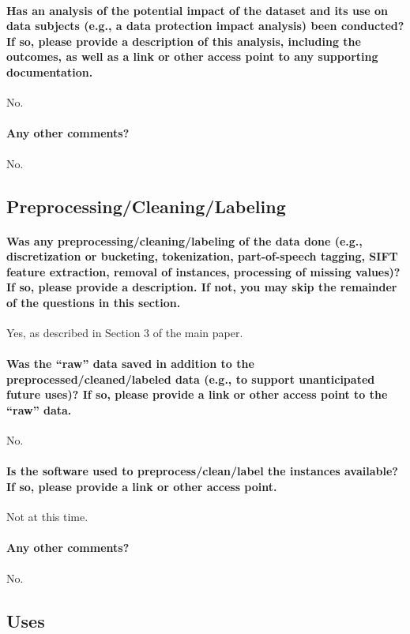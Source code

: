\paragraph{Has an analysis of the potential impact of the dataset and its use
on data subjects (e.g., a data protection impact analysis) been conducted? If so, please provide a description of this analysis, including
the outcomes, as well as a link or other access point to any supporting
documentation.}
No.

\paragraph{Any other comments?}
No.

\subsection{Preprocessing/Cleaning/Labeling}

\paragraph{Was any preprocessing/cleaning/labeling of the data done (e.g.,
discretization or bucketing, tokenization, part-of-speech tagging,
SIFT feature extraction, removal of instances, processing of missing values)? If so, please provide a description. If not, you may skip the
remainder of the questions in this section.}
Yes, as described in Section 3 of the main paper.

\paragraph{Was the “raw” data saved in addition to the preprocessed/cleaned/labeled
data (e.g., to support unanticipated future uses)? If so, please provide a link or other access point to the “raw” data.}
No.

\paragraph{Is the software used to preprocess/clean/label the instances available? If so, please provide a link or other access point.}
Not at this time.

\paragraph{Any other comments?}
No.

\subsection{Uses}
